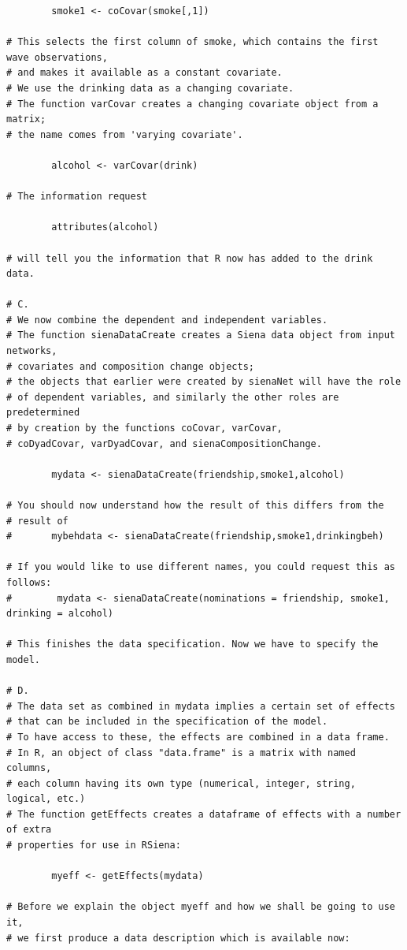 \documentclass[a4paper,fleqn]{article}
\newcommand{\+}{\, + \,}
\begin{document}
{\begin{verbatim}
        smoke1 <- coCovar(smoke[,1])

# This selects the first column of smoke, which contains the first wave observations,
# and makes it available as a constant covariate.
# We use the drinking data as a changing covariate.
# The function varCovar creates a changing covariate object from a matrix;
# the name comes from 'varying covariate'.

        alcohol <- varCovar(drink)

# The information request

        attributes(alcohol)

# will tell you the information that R now has added to the drink data.

# C.
# We now combine the dependent and independent variables.
# The function sienaDataCreate creates a Siena data object from input networks,
# covariates and composition change objects;
# the objects that earlier were created by sienaNet will have the role
# of dependent variables, and similarly the other roles are predetermined
# by creation by the functions coCovar, varCovar,
# coDyadCovar, varDyadCovar, and sienaCompositionChange.

        mydata <- sienaDataCreate(friendship,smoke1,alcohol)

# You should now understand how the result of this differs from the
# result of
#       mybehdata <- sienaDataCreate(friendship,smoke1,drinkingbeh)

# If you would like to use different names, you could request this as follows:
#        mydata <- sienaDataCreate(nominations = friendship, smoke1, drinking = alcohol)

# This finishes the data specification. Now we have to specify the model.

# D.
# The data set as combined in mydata implies a certain set of effects
# that can be included in the specification of the model.
# To have access to these, the effects are combined in a data frame.
# In R, an object of class "data.frame" is a matrix with named columns,
# each column having its own type (numerical, integer, string, logical, etc.)
# The function getEffects creates a dataframe of effects with a number of extra
# properties for use in RSiena:

        myeff <- getEffects(mydata)

# Before we explain the object myeff and how we shall be going to use it,
# we first produce a data description which is available now:


\end{verbatim}}
\end{document}
